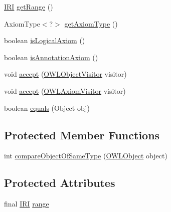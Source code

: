 \begin{DoxyCompactItemize}
\hyperlink{classorg_1_1semanticweb_1_1owlapi_1_1model_1_1_i_r_i}{I\-R\-I} \hyperlink{classuk_1_1ac_1_1manchester_1_1cs_1_1owl_1_1owlapi_1_1_o_w_l_annotation_property_range_axiom_impl_adc83ea0a92bcb1854dfe8f1b8fa1e862}{get\-Range} ()
\item 
Axiom\-Type$<$?$>$ \hyperlink{classuk_1_1ac_1_1manchester_1_1cs_1_1owl_1_1owlapi_1_1_o_w_l_annotation_property_range_axiom_impl_a888a7c9f563e39c1997bb26fe9967ea2}{get\-Axiom\-Type} ()
\item 
boolean \hyperlink{classuk_1_1ac_1_1manchester_1_1cs_1_1owl_1_1owlapi_1_1_o_w_l_annotation_property_range_axiom_impl_a27a4ac029a91a2ae447abb768c0ae6a5}{is\-Logical\-Axiom} ()
\item 
boolean \hyperlink{classuk_1_1ac_1_1manchester_1_1cs_1_1owl_1_1owlapi_1_1_o_w_l_annotation_property_range_axiom_impl_aebeec5c88a1f5c6a1722a37c119d69d8}{is\-Annotation\-Axiom} ()
\item 
void \hyperlink{classuk_1_1ac_1_1manchester_1_1cs_1_1owl_1_1owlapi_1_1_o_w_l_annotation_property_range_axiom_impl_a21a998281a07476c91d2774d9c8d2549}{accept} (\hyperlink{interfaceorg_1_1semanticweb_1_1owlapi_1_1model_1_1_o_w_l_object_visitor}{O\-W\-L\-Object\-Visitor} visitor)
\item 
void \hyperlink{classuk_1_1ac_1_1manchester_1_1cs_1_1owl_1_1owlapi_1_1_o_w_l_annotation_property_range_axiom_impl_a0510927ddbd405fb6029aab7e95e70ed}{accept} (\hyperlink{interfaceorg_1_1semanticweb_1_1owlapi_1_1model_1_1_o_w_l_axiom_visitor}{O\-W\-L\-Axiom\-Visitor} visitor)
\item 
boolean \hyperlink{classuk_1_1ac_1_1manchester_1_1cs_1_1owl_1_1owlapi_1_1_o_w_l_annotation_property_range_axiom_impl_a625dd5a1b01ef4a08622421bebe8a5fc}{equals} (Object obj)
\end{DoxyCompactItemize}
\subsection*{Protected Member Functions}
\begin{DoxyCompactItemize}
\item 
int \hyperlink{classuk_1_1ac_1_1manchester_1_1cs_1_1owl_1_1owlapi_1_1_o_w_l_annotation_property_range_axiom_impl_a6078e61718644b131fe9c5399e5907b7}{compare\-Object\-Of\-Same\-Type} (\hyperlink{interfaceorg_1_1semanticweb_1_1owlapi_1_1model_1_1_o_w_l_object}{O\-W\-L\-Object} object)
\end{DoxyCompactItemize}
\subsection*{Protected Attributes}
\begin{DoxyCompactItemize}
\item 
final \hyperlink{classorg_1_1semanticweb_1_1owlapi_1_1model_1_1_i_r_i}{I\-R\-I} \hyperlink{classuk_1_1ac_1_1manchester_1_1cs_1_1owl_1_1owlapi_1_1_o_w_l_annotation_property_range_axiom_impl_a4c03bfa2769de6a267b912feacd9cb70}{range}
\end{DoxyCompactItemize}
